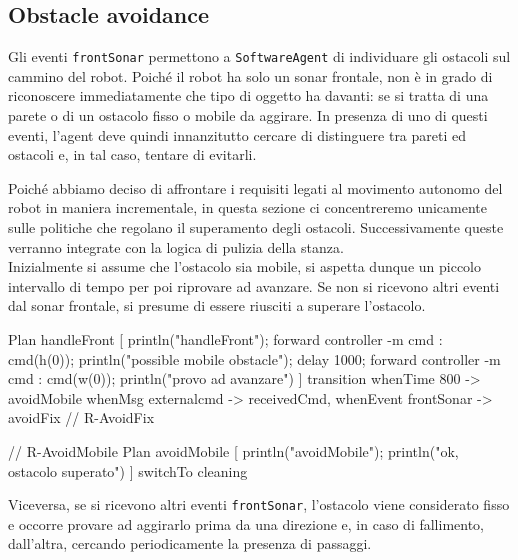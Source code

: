 \documentclass{../llncs}
\newcommand{\codescript}[1]{{\mbox{\small{\texttt{#1}}}}\xspace}
\begin{document}
\subsection{Obstacle avoidance}
Gli eventi \codescript{frontSonar} permettono a \texttt{SoftwareAgent} di individuare gli ostacoli sul cammino del robot. Poiché il robot ha solo un sonar frontale, non è in grado di riconoscere immediatamente che tipo di oggetto ha davanti: se si tratta di una parete o di un ostacolo fisso o mobile da aggirare. In presenza di uno di questi eventi, l'agent deve quindi innanzitutto cercare di distinguere tra pareti ed ostacoli e, in tal caso, tentare di evitarli.

Poiché abbiamo deciso di affrontare i requisiti legati al movimento autonomo del robot in maniera incrementale, in questa sezione ci concentreremo unicamente sulle politiche che regolano il superamento degli ostacoli. Successivamente queste verranno integrate con la logica di pulizia della stanza.\\

Inizialmente si assume che l'ostacolo sia mobile, si aspetta dunque un piccolo intervallo di tempo per poi riprovare ad avanzare. Se non si ricevono altri eventi dal sonar frontale, si presume di essere riusciti a superare l'ostacolo.\\

\begin{qacode}[caption={SoftwareAgent, pt7}]
Plan handleFront [
	println("handleFront");
	forward controller -m cmd : cmd(h(0));
	println("possible mobile obstacle");
	delay 1000;
	forward controller -m cmd : cmd(w(0));
	println("provo ad avanzare")
]
transition
	whenTime 800 -> avoidMobile
	whenMsg externalcmd -> receivedCmd,
	whenEvent frontSonar -> avoidFix // R-AvoidFix
 
 // R-AvoidMobile
 Plan avoidMobile [
	println("avoidMobile");
	println("ok, ostacolo superato")
]
switchTo cleaning
\end{qacode}

Viceversa, se si ricevono altri eventi \codescript{frontSonar}, l'ostacolo viene considerato fisso e occorre provare ad aggirarlo prima da una direzione e, in caso di fallimento, dall'altra, cercando periodicamente la presenza di passaggi.\\
\end{document}
